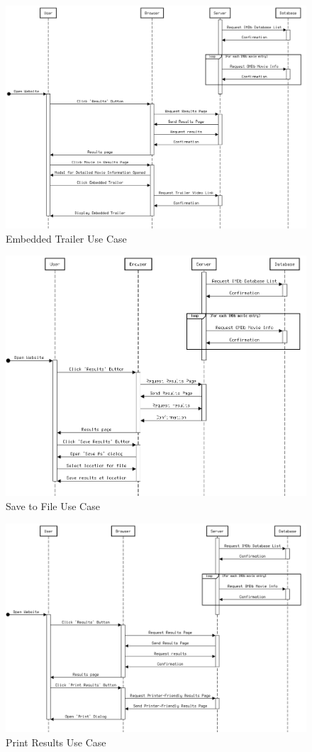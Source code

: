 \documentclass{article}
\begin{document}
\begin{figure}[H]
\includegraphics[width=\columnwidth]{res/sequence_diagram3.png}
\caption{Embedded Trailer Use Case}
\end{figure}

\begin{figure}[]
\includegraphics[width=\columnwidth]{res/sequence_diagram4.png}
\caption{Save to File Use Case}
\end{figure}


\begin{figure}[]
\includegraphics[width=\columnwidth]{res/sequence_diagram5.png}
\caption{Print Results Use Case}
\end{figure}
\end{document}
